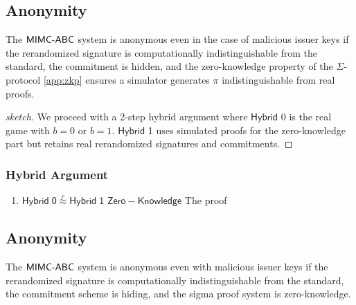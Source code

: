 \begin{figure}
\end{figure}





\subsection{Anonymity}\label{sec:anonymity}
\begin{theorem}[Anonymity]
    The $\mathsf{MIMC\text{-}ABC}$ system is anonymous even in the case of malicious issuer keys if the rerandomized signature is computationally indistinguishable from the standard, the commitment is hidden, and the zero-knowledge property of the $\Sigma$-protocol \ref{app:zkp} ensures a simulator generates $\pi$ indistinguishable from real proofs. 
\end{theorem}

\begin{proof}[sketch]
    We proceed with a 2-step hybrid argument where $\mathsf{Hybrid}$ 0 is the real game with $b = 0$ or $b = 1$. $\mathsf{Hybrid}$ 1 uses simulated proofs for the zero-knowledge part but retains real rerandomized signatures and commitments. 
\end{proof}

\subsubsection*{Hybrid Argument}
\begin{enumerate}
    \item $\mathsf{Hybrid \; 0} \stackrel{c}{\approx} \mathsf{Hybrid \; 1}$ $\mathsf{Zero-Knowledge}$ The proof 
\end{enumerate}


\subsection{Anonymity}
\begin{theorem}[Anonymity]
    The $\mathsf{MIMC\text{-}ABC}$ system is anonymous even with malicious issuer keys if the rerandomized signature is computationally indistinguishable from the standard, the commitment scheme is hiding, and the sigma proof system is zero-knowledge.
\end{theorem}

